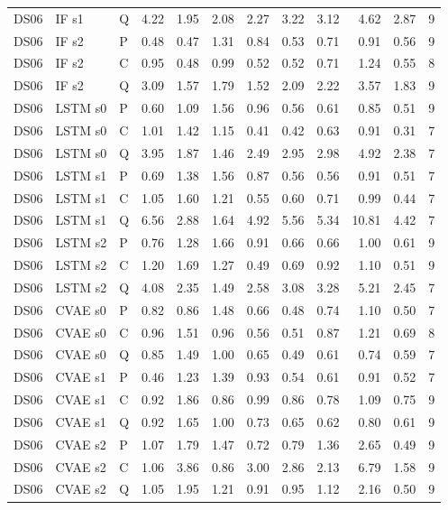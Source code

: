 \documentclass[10pt]{article}
\begin{document}
{\begin{longtable}{lllrrrrrrrrr}
DS06 & IF s1 & Q & 4.22 & 1.95 & 2.08 & 2.27 & 3.22 & 3.12 & 4.62 & 2.87 & 9 \\
DS06 & IF s2 & P & 0.48 & 0.47 & 1.31 & 0.84 & 0.53 & 0.71 & 0.91 & 0.56 & 9 \\
DS06 & IF s2 & C & 0.95 & 0.48 & 0.99 & 0.52 & 0.52 & 0.71 & 1.24 & 0.55 & 8 \\
DS06 & IF s2 & Q & 3.09 & 1.57 & 1.79 & 1.52 & 2.09 & 2.22 & 3.57 & 1.83 & 9 \\
DS06 & LSTM s0 & P & 0.60 & 1.09 & 1.56 & 0.96 & 0.56 & 0.61 & 0.85 & 0.51 & 9 \\
DS06 & LSTM s0 & C & 1.01 & 1.42 & 1.15 & 0.41 & 0.42 & 0.63 & 0.91 & 0.31 & 7 \\
DS06 & LSTM s0 & Q & 3.95 & 1.87 & 1.46 & 2.49 & 2.95 & 2.98 & 4.92 & 2.38 & 7 \\
DS06 & LSTM s1 & P & 0.69 & 1.38 & 1.56 & 0.87 & 0.56 & 0.56 & 0.91 & 0.51 & 7 \\
DS06 & LSTM s1 & C & 1.05 & 1.60 & 1.21 & 0.55 & 0.60 & 0.71 & 0.99 & 0.44 & 7 \\
DS06 & LSTM s1 & Q & 6.56 & 2.88 & 1.64 & 4.92 & 5.56 & 5.34 & 10.81 & 4.42 & 7 \\
DS06 & LSTM s2 & P & 0.76 & 1.28 & 1.66 & 0.91 & 0.66 & 0.66 & 1.00 & 0.61 & 9 \\
DS06 & LSTM s2 & C & 1.20 & 1.69 & 1.27 & 0.49 & 0.69 & 0.92 & 1.10 & 0.51 & 9 \\
DS06 & LSTM s2 & Q & 4.08 & 2.35 & 1.49 & 2.58 & 3.08 & 3.28 & 5.21 & 2.45 & 7 \\
DS06 & CVAE s0 & P & 0.82 & 0.86 & 1.48 & 0.66 & 0.48 & 0.74 & 1.10 & 0.50 & 7 \\
DS06 & CVAE s0 & C & 0.96 & 1.51 & 0.96 & 0.56 & 0.51 & 0.87 & 1.21 & 0.69 & 8 \\
DS06 & CVAE s0 & Q & 0.85 & 1.49 & 1.00 & 0.65 & 0.49 & 0.61 & 0.74 & 0.59 & 7 \\
DS06 & CVAE s1 & P & 0.46 & 1.23 & 1.39 & 0.93 & 0.54 & 0.61 & 0.91 & 0.52 & 7 \\
DS06 & CVAE s1 & C & 0.92 & 1.86 & 0.86 & 0.99 & 0.86 & 0.78 & 1.09 & 0.75 & 9 \\
DS06 & CVAE s1 & Q & 0.92 & 1.65 & 1.00 & 0.73 & 0.65 & 0.62 & 0.80 & 0.61 & 9 \\
DS06 & CVAE s2 & P & 1.07 & 1.79 & 1.47 & 0.72 & 0.79 & 1.36 & 2.65 & 0.49 & 9 \\
DS06 & CVAE s2 & C & 1.06 & 3.86 & 0.86 & 3.00 & 2.86 & 2.13 & 6.79 & 1.58 & 9 \\
DS06 & CVAE s2 & Q & 1.05 & 1.95 & 1.21 & 0.91 & 0.95 & 1.12 & 2.16 & 0.50 & 9 \\

\end{longtable}}
\end{document}
